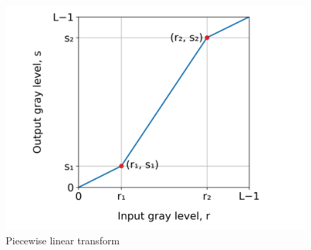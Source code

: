\begin{itemize}
    \begin{minipage}{\linewidth}
      \vspace{-0.5cm}
      \begin{figure}[H]
        \centering
        \includegraphics[width=\linewidth]{images/piecewise_transform.png}
        \vspace{-0.5cm}
        \caption{Piecewise linear transform}
      \end{figure}
    \end{minipage}
\end{itemize}

